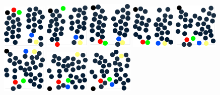 \documentclass{article}
\begin{document}
\begin{figure}
  \includegraphics[width=0.19\textwidth]{graph3d_017.eps}
  \includegraphics[width=0.19\textwidth]{graph3d_019.eps}
  \includegraphics[width=0.19\textwidth]{graph3d_020.eps}
  \includegraphics[width=0.19\textwidth]{graph3d_021.eps}
  \includegraphics[width=0.19\textwidth]{graph3d_022.eps}
  \includegraphics[width=0.19\textwidth]{graph3d_023.eps}
  \includegraphics[width=0.19\textwidth]{graph3d_024.eps}
  \includegraphics[width=0.19\textwidth]{graph3d_025.eps}

\end{figure}
\end{document}
